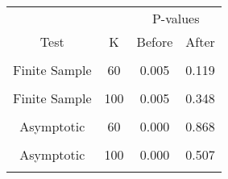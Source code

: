 \begin{table}[!h]
\centering
\begin{tabular}{cccc}
\toprule
\multicolumn{1}{c}{ } & \multicolumn{1}{c}{ } & \multicolumn{2}{c}{P-values} \\
\cmidrule(l{3pt}r{3pt}){3-4}
Test & K & Before & After\\
\midrule
\cellcolor{gray!6}{Finite Sample} & \cellcolor{gray!6}{40} & \cellcolor{gray!6}{0.005} & \cellcolor{gray!6}{0.050}\\
Finite Sample & 60 & 0.005 & 0.119\\
\cellcolor{gray!6}{Finite Sample} & \cellcolor{gray!6}{80} & \cellcolor{gray!6}{0.005} & \cellcolor{gray!6}{0.070}\\
Finite Sample & 100 & 0.005 & 0.348\\
\cellcolor{gray!6}{Asymptotic} & \cellcolor{gray!6}{40} & \cellcolor{gray!6}{0.000} & \cellcolor{gray!6}{0.701}\\
\addlinespace
Asymptotic & 60 & 0.000 & 0.868\\
\cellcolor{gray!6}{Asymptotic} & \cellcolor{gray!6}{80} & \cellcolor{gray!6}{0.000} & \cellcolor{gray!6}{0.356}\\
Asymptotic & 100 & 0.000 & 0.507\\
\cellcolor{gray!6}{ECE} & \cellcolor{gray!6}{} & \cellcolor{gray!6}{0.295} & \cellcolor{gray!6}{0.099}\\
\bottomrule
\end{tabular}
\end{table}
